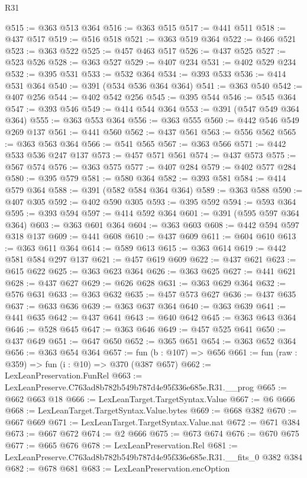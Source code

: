 \begin{lexlean}{R31}
\begin{coremodule}
@515 := @363 @513 @364
@516 := @363 @515
@517 := @441 @511
@518 := @437 @517
@519 := @516 @518
@521 := @363 @519 @364
@522 := @466 @521
@523 := @363 @522
@525 := @457 @463 @517
@526 := @437 @525
@527 := @523 @526
@528 := @363 @527
@529 := @407 @234
@531 := @402 @529 @234
@532 := @395 @531
@533 := @532 @364
@534 := @393 @533
@536 := @414 @531 @364
@540 := @391 (@534 @536 @364 @364)
@541 := @363 @540
@542 := @407 @256
@544 := @402 @542 @256
@545 := @395 @544
@546 := @545 @364
@547 := @393 @546
@549 := @414 @544 @364
@553 := @391 (@547 @549 @364 @364)
@555 := @363 @553 @364
@556 := @363 @555
@560 := @442 @546 @549 @269 @137
@561 := @441 @560
@562 := @437 @561
@563 := @556 @562
@565 := @363 @563 @364
@566 := @541 @565
@567 := @363 @566
@571 := @442 @533 @536 @247 @137
@573 := @457 @571 @561
@574 := @437 @573
@575 := @567 @574
@576 := @363 @575
@577 := @407 @284
@579 := @402 @577 @284
@580 := @395 @579
@581 := @580 @364
@582 := @393 @581
@584 := @414 @579 @364
@588 := @391 (@582 @584 @364 @364)
@589 := @363 @588
@590 := @407 @305
@592 := @402 @590 @305
@593 := @395 @592
@594 := @593 @364
@595 := @393 @594
@597 := @414 @592 @364
@601 := @391 (@595 @597 @364 @364)
@603 := @363 @601 @364
@604 := @363 @603
@608 := @442 @594 @597 @318 @137
@609 := @441 @608
@610 := @437 @609
@611 := @604 @610
@613 := @363 @611 @364
@614 := @589 @613
@615 := @363 @614
@619 := @442 @581 @584 @297 @137
@621 := @457 @619 @609
@622 := @437 @621
@623 := @615 @622
@625 := @363 @623 @364
@626 := @363 @625
@627 := @441 @621
@628 := @437 @627
@629 := @626 @628
@631 := @363 @629 @364
@632 := @576 @631
@633 := @363 @632
@635 := @457 @573 @627
@636 := @437 @635
@637 := @633 @636
@639 := @363 @637 @364
@640 := @363 @639
@641 := @441 @635
@642 := @437 @641
@643 := @640 @642
@645 := @363 @643 @364
@646 := @528 @645
@647 := @363 @646
@649 := @457 @525 @641
@650 := @437 @649
@651 := @647 @650
@652 := @365 @651
@654 := @363 @652 @364
@656 := @363 @654 @364
@657 := fun (b : @107) => @656
@661 := fun (raw : @359) => fun (i : @10) => @370 (@387 @657)
@662 := LexLeanPreservation.FunRel
@663 := LexLeanPreserve.C763ad8b782b549b787d4e95f336e685e.R31.__prog
@665 := @662 @663 @18
@666 := LexLeanTarget.TargetSyntax.Value
@667 := @6 @666
@668 := LexLeanTarget.TargetSyntax.Value.bytes
@669 := @668 @382
@670 := @667 @669
@671 := LexLeanTarget.TargetSyntax.Value.nat
@672 := @671 @384
@673 := @667 @672
@674 := @2 @666
@675 := @673 @674
@676 := @670 @675
@677 := @665 @676
@678 := LexLeanPreservation.Rel
@681 := LexLeanPreserve.C763ad8b782b549b787d4e95f336e685e.R31.__fits_0 @382 @384
@682 := @678 @681
@683 := LexLeanPreservation.encOption

\end{coremodule}
\end{lexlean}
